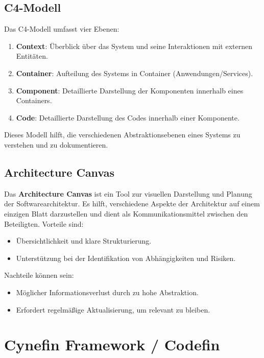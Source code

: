 \subsection{C4-Modell}

Das C4-Modell umfasst vier Ebenen:

\begin{enumerate}
    \item \textbf{Context}: Überblick über das System und seine Interaktionen mit externen Entitäten.
    \item \textbf{Container}: Aufteilung des Systems in Container (Anwendungen/Services).
    \item \textbf{Component}: Detaillierte Darstellung der Komponenten innerhalb eines Containers.
    \item \textbf{Code}: Detaillierte Darstellung des Codes innerhalb einer Komponente.
\end{enumerate}

Dieses Modell hilft, die verschiedenen Abstraktionsebenen eines Systems zu verstehen und zu dokumentieren.

\subsection{Architecture Canvas}

Das \textbf{Architecture Canvas} ist ein Tool zur visuellen Darstellung und Planung der Softwarearchitektur. Es hilft, verschiedene Aspekte der Architektur auf einem einzigen Blatt darzustellen und dient als Kommunikationsmittel zwischen den Beteiligten. Vorteile sind:

\begin{itemize}
    \item Übersichtlichkeit und klare Strukturierung.
    \item Unterstützung bei der Identifikation von Abhängigkeiten und Risiken.
\end{itemize}

Nachteile können sein:

\begin{itemize}
    \item Möglicher Informationsverlust durch zu hohe Abstraktion.
    \item Erfordert regelmäßige Aktualisierung, um relevant zu bleiben.
\end{itemize}

\section{Cynefin Framework / Codefin}

